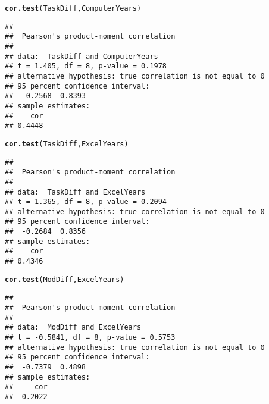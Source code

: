 \documentclass[12pt, twoside, a4paper, openright]{report}\usepackage[]{graphicx}\usepackage[]{color}
\makeatletter
\newcommand{\hlstd}[1]{\textcolor[rgb]{0.345,0.345,0.345}{#1}}%
\newcommand{\hlkwd}[1]{\textcolor[rgb]{0.737,0.353,0.396}{\textbf{#1}}}%
\newenvironment{kframe}{%
 \def\at@end@of@kframe{}%
 \ifinner\ifhmode%
  \def\at@end@of@kframe{\end{minipage}}%
  \begin{minipage}{\columnwidth}%
 \fi\fi%
 \def\FrameCommand##1{\hskip\@totalleftmargin \hskip-\fboxsep
 \colorbox{shadecolor}{##1}\hskip-\fboxsep
     \hskip-\linewidth \hskip-\@totalleftmargin \hskip\columnwidth}%
 \MakeFramed {\advance\hsize-\width
   \@totalleftmargin\z@ \linewidth\hsize
   \@setminipage}}%
 {\par\unskip\endMakeFramed%
 \at@end@of@kframe}
\newenvironment{knitrout}{}{} %
\makeatother
\begin{document}
\begin{knitrout}
\color{fgcolor}\begin{kframe}
\begin{alltt}
\hlkwd{cor.test}\hlstd{(TaskDiff, ComputerYears)}
\end{alltt}
\begin{verbatim}
## 
## 	Pearson's product-moment correlation
## 
## data:  TaskDiff and ComputerYears
## t = 1.405, df = 8, p-value = 0.1978
## alternative hypothesis: true correlation is not equal to 0
## 95 percent confidence interval:
##  -0.2568  0.8393
## sample estimates:
##    cor 
## 0.4448
\end{verbatim}
\begin{alltt}
\hlkwd{cor.test}\hlstd{(TaskDiff, ExcelYears)}
\end{alltt}
\begin{verbatim}
## 
## 	Pearson's product-moment correlation
## 
## data:  TaskDiff and ExcelYears
## t = 1.365, df = 8, p-value = 0.2094
## alternative hypothesis: true correlation is not equal to 0
## 95 percent confidence interval:
##  -0.2684  0.8356
## sample estimates:
##    cor 
## 0.4346
\end{verbatim}
\begin{alltt}
\hlkwd{cor.test}\hlstd{(ModDiff, ExcelYears)}
\end{alltt}
\begin{verbatim}
## 
## 	Pearson's product-moment correlation
## 
## data:  ModDiff and ExcelYears
## t = -0.5841, df = 8, p-value = 0.5753
## alternative hypothesis: true correlation is not equal to 0
## 95 percent confidence interval:
##  -0.7379  0.4898
## sample estimates:
##     cor 
## -0.2022
\end{verbatim}
\end{kframe}
\end{knitrout}


\end{document}
